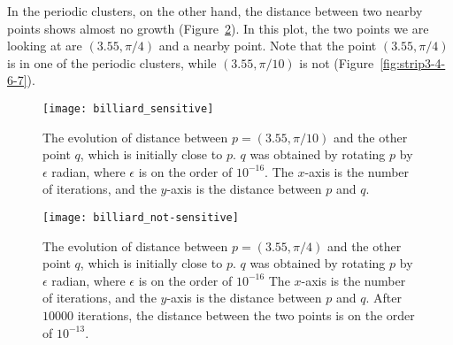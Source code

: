 \documentclass[10pt,twoside]{book}
\begin{document}
In the periodic clusters, on the other hand, the distance between two nearby points shows almost no growth (Figure~\ref{fig:sensitivity2}).
In this plot, the two points we are looking at are $(3.55,\pi/4)$ and a nearby point.
Note that the point $(3.55,\pi/4)$ is in one of the periodic clusters, while $(3.55,\pi/10)$ is not (Figure~\ref{fig:strip3-4-6-7}).

\begin{figure}[ht]
  \begin{center}
    \texttt{[image: billiard\_sensitive]}
    \caption{The evolution of distance between $p = (3.55, \pi/10)$ and the other point $q$, which is initially close to $p$.
      $q$ was obtained by rotating $p$ by $\epsilon$ radian, where $\epsilon$ is on the order of $10^{-16}$.
      The $x$-axis is the number of iterations, and the $y$-axis is the distance between $p$ and $q$.
    }
    \label{fig:sensitivity1}
  \end{center}
\end{figure}
\begin{figure}[ht]
  \begin{center}
    \texttt{[image: billiard\_not-sensitive]}
    \caption{The evolution of distance between $p = (3.55, \pi/4)$ and the other point $q$, which is initially close to $p$.
      $q$ was obtained by rotating $p$ by $\epsilon$ radian, where $\epsilon$ is on the order of $10^{-16}$
      The $x$-axis is the number of iterations, and the $y$-axis is the distance between $p$ and $q$.
      After $10000$ iterations, the distance between the two points is on the order of $10^{-13}$.
    }
    \label{fig:sensitivity2}
  \end{center}
\end{figure}




\printindex
\end{document}
